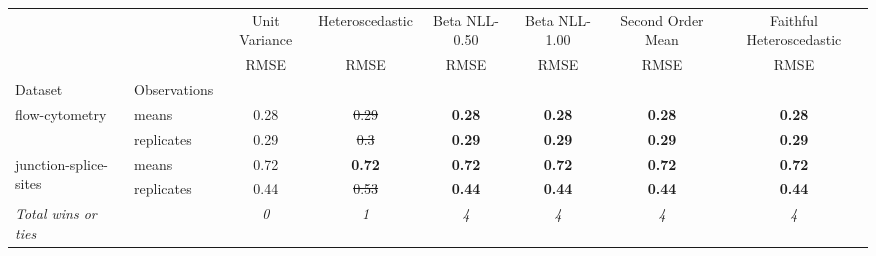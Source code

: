 \begin{tabular}{ll|c|c|c|c|c|c}
\toprule
{} & {} & {Unit Variance} & {Heteroscedastic} & {Beta NLL-0.50} & {Beta NLL-1.00} & {Second Order Mean} & {Faithful Heteroscedastic} \\
{} & {} & {RMSE} & {RMSE} & {RMSE} & {RMSE} & {RMSE} & {RMSE} \\
{Dataset} & {Observations} & {} & {} & {} & {} & {} & {} \\
\midrule
\multirow[t]{2}{*}{flow-cytometry} & means & 0.28 & \sout{0.29} & \textbf{0.28} & \textbf{0.28} & \textbf{0.28} & \textbf{0.28} \\
 & replicates & 0.29 & \sout{0.3} & \textbf{0.29} & \textbf{0.29} & \textbf{0.29} & \textbf{0.29} \\
\multirow[t]{2}{*}{junction-splice-sites} & means & 0.72 & \textbf{0.72} & \textbf{0.72} & \textbf{0.72} & \textbf{0.72} & \textbf{0.72} \\
 & replicates & 0.44 & \sout{0.53} & \textbf{0.44} & \textbf{0.44} & \textbf{0.44} & \textbf{0.44} \\
\textit{{Total wins or ties}} &  & \textit{0} & \textit{1} & \textit{4} & \textit{4} & \textit{4} & \textit{4} \\
\bottomrule
\end{tabular}
